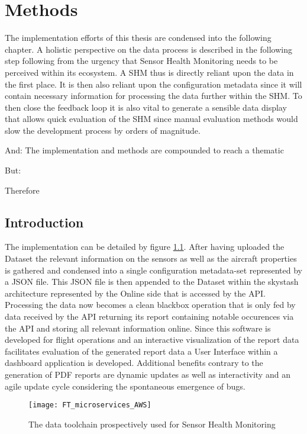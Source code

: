 \chapter{Methods}

The implementation efforts of this thesis are condensed into the following chapter. A holistic perspective on the data process is described in the following step following from the urgency that Sensor Health Monitoring needs to be perceived within its ecosystem. A SHM thus is directly reliant upon the data in the first place. It is then also reliant upon the configuration metadata since it will contain necessary information for processing the data further within the SHM. To then close the feedback loop it is also vital to generate a sensible data display that allows quick evaluation of the SHM since manual evaluation methods would slow the development process by orders of magnitude.

And: The implementation and methods are compounded to reach a thematic

But:


Therefore


\section{Introduction}


The implementation can be detailed by figure \ref{fig:fti_microservices}. After having uploaded the Dataset the relevant information on the sensors as well as the aircraft properties is gathered and condensed into a single configuration metadata-set represented by a JSON file. This JSON file is then appended to the Dataset within the skystash architecture represented by the Online side that is accessed by the API. Processing the data now becomes a clean blackbox operation that is only fed by data received by the API returning its report containing notable occurences via the API and storing all relevant information online. Since this software is developed for flight operations and an interactive visualization of the report data facilitates evaluation of the generated report data a User Interface within a dashboard application is developed. Additional benefits contrary to the generation of PDF reports are dynamic updates as well as interactivity and an agile update cycle considering the spontaneous emergence of bugs.


\begin{figure}[h]
    \centering
    \texttt{[image: FT\_microservices\_AWS]}
    \caption{The data toolchain prospectively used for Sensor Health Monitoring}
    \label{fig:fti_microservices}
\end{figure}


